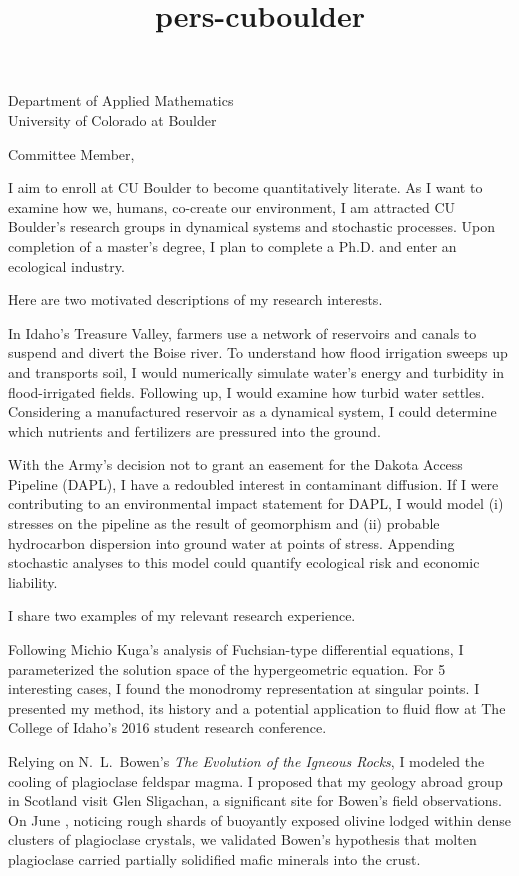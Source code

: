 \documentclass[10pt]{letter}
\date{}
\title{pers-cuboulder}
\newcommand{\topic}[1]{\textmd{#1}}
\begin{document}
\begin{letter}{Department of Applied Mathematics\\University of Colorado at Boulder}

\opening{Committee Member,}
I aim to enroll at CU Boulder to become quantitatively literate. As I want to examine how we, humans, co-create our environment, I am attracted CU Boulder's research groups in dynamical systems and stochastic processes. Upon completion of a master's degree, I plan to complete a Ph.D. and enter an ecological industry.

Here are two motivated descriptions of my research interests. 

\begin{description}[topsep=0pt]
	\item[Irrigation Regimes]
        In Idaho's Treasure Valley, farmers use a network of reservoirs and canals to suspend and divert the Boise river. To understand how flood irrigation sweeps up and transports soil, I would numerically simulate water's energy and \topic{turbidity} in flood-irrigated fields. Following up, I would examine how turbid water settles. Considering a manufactured reservoir as a dynamical system, I could determine which nutrients and fertilizers are pressured into the ground.
	\item[Ground Water Contamination]
		With the Army's decision not to grant an easement for the Dakota Access Pipeline (DAPL), I have a redoubled interest in \topic{contaminant diffusion}. If I were contributing to an environmental impact statement for DAPL, I would model (i) stresses on the pipeline as the result of geomorphism and (ii) probable hydrocarbon dispersion into ground water at points of stress. Appending stochastic analyses to this model could quantify ecological risk and economic liability.
\end{description}

I share two examples of my relevant research experience.

\begin{description}[topsep=0pt]
    \item[Galois Theory \& Fuchsian Equations] 
    	Following Michio Kuga's analysis of Fuchsian-type differential equations, I parameterized the solution space of the hypergeometric equation. For 5 interesting cases, I found the monodromy representation at singular points. I presented my method, its history and a potential application to \topic{fluid flow} at The College of Idaho's 2016 student research conference.
    \item[Igneous Dikes in Scotland]
        Relying on N.~L.~Bowen's \emph{The Evolution of the Igneous Rocks}, I modeled the cooling of plagioclase feldspar magma. I proposed that my geology abroad group in Scotland visit Glen Sligachan, a significant site for Bowen's field observations. On June , noticing rough shards of buoyantly exposed olivine lodged within dense clusters of plagioclase crystals, we validated Bowen's hypothesis that molten plagioclase carried partially solidified mafic minerals into the crust.
\end{description}


\end{letter}
\end{document}
